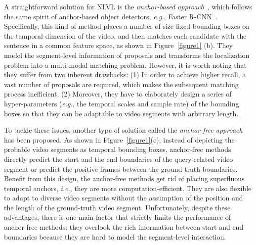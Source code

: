 \documentclass[letterpaper]{article} %
\newcommand{\ie}{\emph{i.e.}}
\newcommand{\eg}{\emph{e.g.}}
\begin{document}
A straightforward solution for NLVL is the \emph{anchor-based approach}~\cite{DBLP:conf/iccv/GaoSYN17,DBLP:conf/emnlp/HendricksWSSDR18,DBLP:conf/mm/LiuWN0CC18,DBLP:conf/aaai/ChenJ19a,DBLP:conf/wacv/GeGCN19,DBLP:conf/aaai/Xu0PSSS19,DBLP:conf/cvpr/ZhangDWWD19,ChenCMJC18,DBLP:conf/aaai/Wang0J20},
which follows the same spirit of anchor-based object detectors, \eg, Faster R-CNN~\cite{DBLP:conf/nips/RenHGS15}.
Specifically, this kind of method places a number of size-fixed bounding boxes on the temporal dimension of the video,   
and then matches each candidate with the sentence in a common feature space, as shown in Figure~\ref{figure1} (b).
They model the segment-level information of proposals and transforms the localization problem into a multi-modal matching problem.
However, it is worth noting that they suffer from two inherent drawbacks:
(1) In order to achieve higher recall, a vast number of proposals are required, which makes the subsequent matching process inefficient. 
(2) Moreover, they have to elaborately design a series of hyper-parameters (\eg, the temporal scales and sample rate) of the bounding boxes so that they can be adaptable to video segments with arbitrary length.

To tackle these issues, another type of solution called the  \emph{anchor-free approach}~\cite{DBLP:conf/aaai/ChenLTXZTL20,DBLP:conf/aaai/ChenJ19a,DBLP:conf/aaai/YuanM019,LuCTLX19,DBLP:conf/acl/ZhangSJZ20,DBLP:conf/wacv/OpazoMSLG20,DBLP:conf/cvpr/MunCH20} has been proposed. 
As shown in Figure~\ref{figure1}(c), instead of depicting the probable video segments as temporal bounding boxes, anchor-free methods directly predict the start and the end boundaries of the query-related video segment or predict the positive frames between the ground-truth boundaries. 
Benefit from this design, 
the anchor-free methods get rid of placing superfluous temporal anchors, \ie, they are more computation-efficient. 
They are also flexible to adapt to diverse video segments without the assumption of the position and the length of the ground-truth video segment.
Unfortunately, despite these advantages, there is one main factor that strictly limits the performance of anchor-free methods: they overlook the rich information between start and end boundaries 
because they are hard to model the segment-level interaction.
\end{document}
